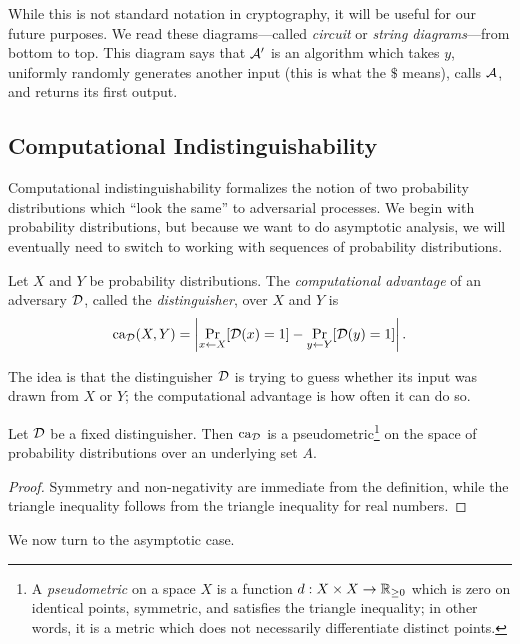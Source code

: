 While this is not standard notation in cryptography, it will be useful for our future purposes.
We read these diagrams---called \emph{circuit} or \emph{string diagrams}---from
bottom to top. This diagram says that $\mathcal{A}'$ is an algorithm which takes $y$,
uniformly randomly generates another input (this is what the $\$$ means), calls
$\mathcal{A}$, and returns its first output.

\subsection{Computational Indistinguishability}

Computational indistinguishability formalizes the notion of two probability
distributions which ``look the same'' to adversarial processes. We begin with
probability distributions, but because we want to do asymptotic analysis, we
will eventually need to switch to working with sequences of probability
distributions.

\begin{dfn}\label{def:computational advantage}
  Let $X$ and $Y$ be probability distributions. The \emph{computational
  advantage} of an adversary $\mathcal{D}$, called the
  \emph{distinguisher}, over $X$ and $Y$ is \[
    \operatorname{ca}_{\mathcal{D}}(X, Y) = \left|\Pr_{x\leftarrow X}[\mathcal{D}(x) = 1] - \Pr_{y\leftarrow Y}[\mathcal{D}(y) = 1]\right|.
  \]
\end{dfn}

The idea is that the distinguisher $\mathcal{D}$ is trying to guess whether its input
was drawn from $X$ or $Y$; the computational advantage is how often it can do
so.

\begin{prop}\label{thm:advantage is metric}
  Let $\mathcal{D}$ be a fixed distinguisher. Then $\operatorname{ca}_{\mathcal{D}}$ is a
  pseudometric\footnote{
    A \emph{pseudometric} on a space $X$ is a function $d: X\times X\to\mathbb{R}_{\geq 0}$ which
    is zero on identical points, symmetric, and satisfies the triangle
    inequality; in other words, it is a metric which does not necessarily
    differentiate distinct points.
  } on the
  space of probability distributions over an underlying set $A$.
\end{prop}

\begin{proof}
  Symmetry and non-negativity are immediate from the definition, while the
  triangle inequality follows from the triangle inequality for real numbers.
\end{proof}

We now turn to the asymptotic case.

